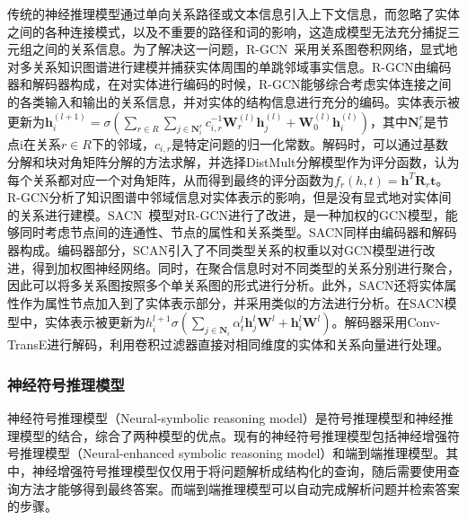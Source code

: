\documentclass[algorithmlist, AutoFakeBold, AutoFakeSlant, figurelist, tablelist, nomlist, masters]{seuthesix}
\begin{document}
传统的神经推理模型通过单向关系路径或文本信息引入上下文信息，而忽略了实体之间的各种连接模式，以及不重要的路径和词的影响，这造成模型无法充分捕捉三元组之间的关系信息。为了解决这一问题，R-GCN~\cite{schlichtkrull2018modeling}采用关系图卷积网络，显式地对多关系知识图谱进行建模并捕获实体周围的单跳邻域事实信息。R-GCN由编码器和解码器构成，在对实体进行编码的时候，R-GCN能够综合考虑实体连接之间的各类输入和输出的关系信息，并对实体的结构信息进行充分的编码。实体表示被更新为$\bm{h}_i^{(l+1)}=\sigma\left(\sum_{r \in R} \sum_{j \in \mathbf{N}_i^r} c_{i, r}^{-1} \mathbf{W}_r^{(l)} \bm{h}_j^{(l)}+\mathbf{W}_0^{(l)} \bm{h}_i^{(l)}\right)$，其中$\mathbf{N}_i^r$是节点i在关系$r \in R$下的邻域，$c_{i,r}$是特定问题的归一化常数。解码时，可以通过基数分解和块对角矩阵分解的方法求解，并选择DistMult分解模型作为评分函数，认为每个关系都对应一个对角矩阵，从而得到最终的评分函数为$f_r(h, t)=\bm{h}^T \mathbf{R}_r \bm{t}$。R-GCN分析了知识图谱中邻域信息对实体表示的影响，但是没有显式地对实体间的关系进行建模。SACN~\cite{shang2019end}模型对R-GCN进行了改进，是一种加权的GCN模型，能够同时考虑节点间的连通性、节点的属性和关系类型。SACN同样由编码器和解码器构成。编码器部分，SCAN引入了不同类型关系的权重以对GCN模型进行改进，得到加权图神经网络。同时，在聚合信息时对不同类型的关系分别进行聚合，因此可以将多关系图按照多个单关系图的形式进行分析。此外，SACN还将实体属性作为属性节点加入到了实体表示部分，并采用类似的方法进行分析。在SACN模型中，实体表示被更新为$h_i^{l+1}\sigma\left(\sum_{j \in \mathbf{N}_i} \alpha_t^l \bm{h}_j^l \mathbf{W}^l+\bm{h}_i^l \mathbf{W}^l\right)$。解码器采用Conv-TransE进行解码，利用卷积过滤器直接对相同维度的实体和关系向量进行处理。

\subsubsection{神经符号推理模型}
神经符号推理模型（Neural-symbolic reasoning model）是符号推理模型和神经推理模型的结合，综合了两种模型的优点。现有的神经符号推理模型包括神经增强符号推理模型（Neural-enhanced symbolic reasoning model）和端到端推理模型。其中，神经增强符号推理模型仅仅用于将问题解析成结构化的查询，随后需要使用查询方法才能够得到最终答案。而端到端推理模型可以自动完成解析问题并检索答案的步骤。
\end{document}
